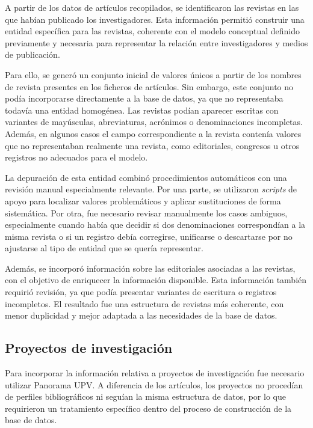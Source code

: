 \documentclass[11pt,spanish,listoffigures,listoftables]{tfgetsinf}
\begin{document}
A partir de los datos de artículos recopilados, se identificaron las revistas en las que habían publicado los investigadores. Esta información permitió construir una entidad específica para las revistas, coherente con el modelo conceptual definido previamente y necesaria para representar la relación entre investigadores y medios de publicación.

Para ello, se generó un conjunto inicial de valores únicos a partir de los nombres de revista presentes en los ficheros de artículos. Sin embargo, este conjunto no podía incorporarse directamente a la base de datos, ya que no representaba todavía una entidad homogénea. Las revistas podían aparecer escritas con variantes de mayúsculas, abreviaturas, acrónimos o denominaciones incompletas. Además, en algunos casos el campo correspondiente a la revista contenía valores que no representaban realmente una revista, como editoriales, congresos u otros registros no adecuados para el modelo.

La depuración de esta entidad combinó procedimientos automáticos con una revisión manual especialmente relevante. Por una parte, se utilizaron \textit{scripts} de apoyo para localizar valores problemáticos y aplicar sustituciones de forma sistemática. Por otra, fue necesario revisar manualmente los casos ambiguos, especialmente cuando había que decidir si dos denominaciones correspondían a la misma revista o si un registro debía corregirse, unificarse o descartarse por no ajustarse al tipo de entidad que se quería representar.

Además, se incorporó información sobre las editoriales asociadas a las revistas, con el objetivo de enriquecer la información disponible. Esta información también requirió revisión, ya que podía presentar variantes de escritura o registros incompletos. El resultado fue una estructura de revistas más coherente, con menor duplicidad y mejor adaptada a las necesidades de la base de datos.

\subsection{Proyectos de investigación}

Para incorporar la información relativa a proyectos de investigación fue necesario utilizar Panorama UPV. A diferencia de los artículos, los proyectos no procedían de perfiles bibliográficos ni seguían la misma estructura de datos, por lo que requirieron un tratamiento específico dentro del proceso de construcción de la base de datos.
\end{document}

